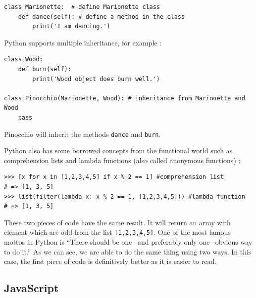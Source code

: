 \documentclass[a4paper,10pt]{article}
\begin{document}
\begin{lstlisting}
class Marionette:  # define Marionette class
    def dance(self): # define a method in the class
        print('I am dancing.')
\end{lstlisting}


Python supports multiple inheritance, for example :


\begin{lstlisting}
class Wood:
    def burn(self):
        print('Wood object does burn well.')

class Pinocchio(Marionette, Wood): # inheritance from Marionette and Wood
    pass
\end{lstlisting}

Pinocchio will inherit the methods \lstinline|dance| and \lstinline|burn|.

Python also has some borrowed concepts from the functional world such as comprehension lists and lambda functions (also called anonymous functions) :

\begin{lstlisting}
>>> [x for x in [1,2,3,4,5] if x % 2 == 1] #comprehension list
# => [1, 3, 5]
>>> list(filter(lambda x: x % 2 == 1, [1,2,3,4,5])) #lambda function
# => [1, 3, 5]
\end{lstlisting}

These two pieces of code have the same result. It will return an array with element which are odd from the list \lstinline|[1,2,3,4,5]|. One of the most famous mottos in Python is “There should be one-- and preferably only one --obvious way to do it.” As we can see, we are able to do the same thing using two ways. In this case, the first piece of code is definitively better as it is easier to read.



\subsection{JavaScript}
\setjs
\end{document}
